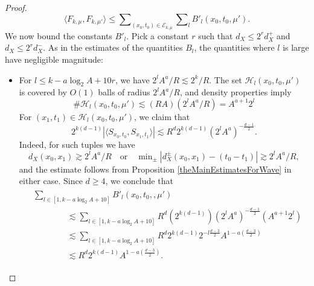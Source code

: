 \begin{proof}
\begin{equation}
    \langle F_{k,\mu}, F_{k,\mu'} \rangle \leq \sum\nolimits_{(x_0,t_0) \in \mathcal{E}_{k,\mu}} \sum\nolimits_l B'_l(x_0,t_0,\mu').
\end{equation}
%
We now bound the constants $B'_l$. Pick a constant $r$ such that $d_X \leq 2^r d_X^+$ and $d_X \leq 2^r d_X^-$. As in the estimates of the quantities $B_l$, the quantities where $l$ is large have negligible magnitude:
%
\begin{itemize}
    \item For $l \leq k - a \log_2 A + 10 r$, we have $2^l A^a / R \lesssim 2^k / R$. The set $\mathcal{H}_l(x_0,t_0,\mu')$ is covered by $O(1)$ balls of radius $2^l A^a / R$, and density properties imply
    \begin{equation}
        \# \mathcal{H}_l(x_0,t_0,\mu') \lesssim (R A) (2^l A^a / R) = A^{a+1} 2^l
    \end{equation}
    For $(x_1,t_1) \in \mathcal{H}_l(x_0,t_0,\mu')$, we claim that
    \begin{equation}
        2^{k(d-1)} |\langle {S\!}_{x_0,t_0}, {S\!}_{x_1,t_1} \rangle| \lesssim R^{d} 2^{k(d-1)} (2^l A^a)^{- \frac{d-1}{2}}.
    \end{equation}
    Indeed, for such tuples we have
    \begin{equation}
        d_X(x_0,x_1) \gtrsim 2^l A^a / R \quad\text{or}\quad \min\nolimits_{\pm} |d_X^{\pm}(x_0,x_1) - (t_0 - t_1)| \gtrsim 2^l A^a / R,
    \end{equation}
    and the estimate follows from Proposition \ref{theMainEstimatesForWave} in either case. Since $d \geq 4$, we conclude that
    \begin{align} \label{BBBEquation}
    \begin{split}
        &\sum\nolimits_{l \in [1, k - a \log_2 A + 10]} B'_l(x_0,t_0,,\mu')\\
        &\quad\quad\quad\quad \lesssim \sum\nolimits_{l \in [1, k - a \log_2 A + 10]} R^{d} (2^{k(d-1)}) (2^l A^a)^{- \frac{d-1}{2}} (A^{a+1} 2^l)\\
        &\quad\quad\quad\quad \lesssim \sum\nolimits_{l \in [1, k - a \log_2 A + 10]} R^{d}  2^{k(d-1)} 2^{-l \frac{d-3}{2}} A^{1 - a \left( \frac{d-3}{2} \right)}\\
        &\quad\quad\quad\quad \lesssim R^{d} 2^{k(d-1)} A^{1 - a \left( \frac{d-3}{2} \right)}.
    \end{split}
    \end{align}


\end{itemize}
\end{proof}
